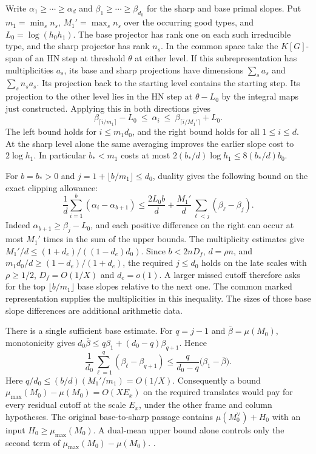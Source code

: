 Write \(\alpha_1\ge\cdots\ge\alpha_d\) and
\(\beta_1\ge\cdots\ge\beta_{d_0}\) for the sharp and base
primal slopes. Put \(m_1=\min_s n_s\), \(M_1'=\max_s n_s\)
over the occurring good types, and \(L_0=\log(h_0h_1)\).
The base projector has rank one on each such irreducible type,
and the sharp projector has rank \(n_s\). In the common space take
the \(K[G]\)-span of an HN step at threshold \(\theta\) at either
level. If this subrepresentation has multiplicities \(a_s\), its
base and sharp projections have dimensions \(\sum_s a_s\) and
\(\sum_s n_s a_s\). Its projection back to the starting level
contains the starting step. Its projection to the other level lies
in the HN step at \(\theta-L_0\) by the integral maps just
constructed. Applying this in both directions gives
\[
 \beta_{\lceil i/m_1\rceil}-L_0
      \ \le\ \alpha_i\ \le\
       \beta_{\lceil i/M_1'\rceil}+L_0 .
\]
The left bound holds for \(i\le m_1 d_0\), and the right bound
holds for all \(1\le i\le d\). At the sharp level alone the same
averaging improves the earlier slope cost to \(2\log h_1\).
In particular \(b_*<m_1\) costs at most
\(2(b_*/d)\log h_1\le 8(b_*/d)b_0\).

For \(b=b_*>0\) and \(j=1+\lfloor b/m_1\rfloor\le d_0\),
duality gives the following bound on the exact clipping allowance:
\[
 \frac{1}{d}\sum_{i=1}^{b}(\alpha_i-\alpha_{b+1})
 \le \frac{2L_0 b}{d}+
         \frac{M_1'}{d}\sum_{\ell<j}(\beta_\ell-\beta_j).
\]
Indeed \(\alpha_{b+1}\ge\beta_j-L_0\), and each positive difference
on the right can occur at most \(M_1'\) times in the sum of the
upper bounds. The multiplicity estimates give
\(M_1'/d\le(1+d_e)/((1-d_e)d_0)\).
Since \(b<2nD_f\), \(d=\rho n\), and
\(m_1d_0/d\ge(1-d_e)/(1+d_e)\), the required \(j\le d_0\)
holds on the late scales with \(\rho\ge1/2\), \(D_f=O(1/X)\)
and \(d_e=o(1)\). A larger missed cutoff therefore asks for the
top \(\lfloor b/m_1\rfloor\) base slopes relative to the next one.
The common marked representation supplies the multiplicities in
this inequality. The sizes of those base slope differences are
additional arithmetic data.

There is a single sufficient base estimate. For \(q=j-1\) and
\(\bar\beta=\mu(M_0)\), monotonicity gives
\(d_0\bar\beta\le q\beta_1+(d_0-q)\beta_{q+1}\). Hence
\[
 \frac{1}{d_0}\sum_{\ell=1}^{q}(\beta_\ell-\beta_{q+1})
     \le\frac{q}{d_0-q}\big(\beta_1-\bar\beta\big).
\]
Here \(q/d_0\le (b/d)(M_1'/m_1)=O(1/X)\). Consequently a bound
\(\mu_{\max}(M_0)-\mu(M_0)=O(X E_x)\) on the required translates
would pay for every residual cutoff at the scale \(E_x\), under
the other frame and column hypotheses. The original base-to-sharp
passage contains \(\mu(M_0^\vee)+H_0\) with an input
\(H_0\ge\mu_{\max}(M_0)\). A dual-mean upper bound alone controls
only the second term of \(\mu_{\max}(M_0)-\mu(M_0)\).
.

